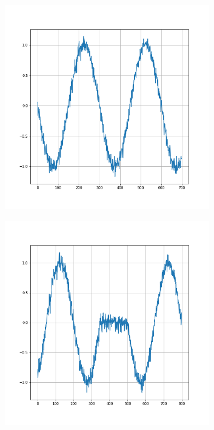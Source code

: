 \begin{figure}[h!]
    \begin{subfigure}{0.333\textwidth}
        \centering
        \includegraphics[height=0.3\textheight,width=0.98\textwidth]{images/intro_ood_anomaly/normal_train.png}
        \caption{}
        \label{fig:normal_train_time}
    \end{subfigure}
    \begin{subfigure}{0.333\textwidth}
        \centering
        \includegraphics[height=0.3\textheight,width=0.98\textwidth]{images/intro_ood_anomaly/anomaly_train.png}

\end{subfigure}
\end{figure}
